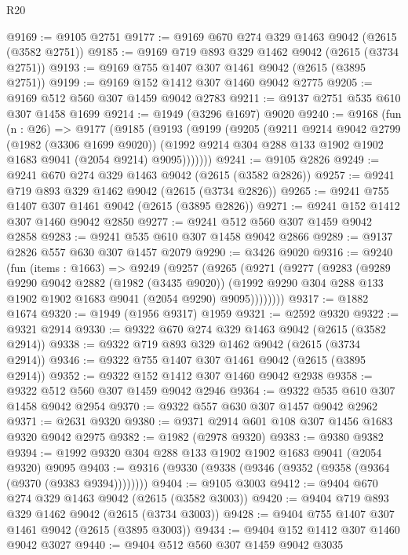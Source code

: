 \begin{lexlean}{R20}
\begin{coremodule}
@9169 := @9105 @2751
@9177 := @9169 @670 @274 @329 @1463 @9042 (@2615 (@3582 @2751))
@9185 := @9169 @719 @893 @329 @1462 @9042 (@2615 (@3734 @2751))
@9193 := @9169 @755 @1407 @307 @1461 @9042 (@2615 (@3895 @2751))
@9199 := @9169 @152 @1412 @307 @1460 @9042 @2775
@9205 := @9169 @512 @560 @307 @1459 @9042 @2783
@9211 := @9137 @2751 @535 @610 @307 @1458 @1699
@9214 := @1949 (@3296 @1697) @9020
@9240 := @9168
    (fun (n : @26) =>
    @9177
      (@9185
        (@9193
          (@9199
            (@9205
              (@9211
                @9214
                @9042
                @2799
                (@1982 (@3306 @1699 @9020))
                (@1992 @9214 @304 @288 @133 @1902 @1902 @1683 @9041 (@2054 @9214) @9095)))))))
@9241 := @9105 @2826
@9249 := @9241 @670 @274 @329 @1463 @9042 (@2615 (@3582 @2826))
@9257 := @9241 @719 @893 @329 @1462 @9042 (@2615 (@3734 @2826))
@9265 := @9241 @755 @1407 @307 @1461 @9042 (@2615 (@3895 @2826))
@9271 := @9241 @152 @1412 @307 @1460 @9042 @2850
@9277 := @9241 @512 @560 @307 @1459 @9042 @2858
@9283 := @9241 @535 @610 @307 @1458 @9042 @2866
@9289 := @9137 @2826 @557 @630 @307 @1457 @2079
@9290 := @3426 @9020
@9316 := @9240
    (fun (items : @1663) =>
    @9249
      (@9257
        (@9265
          (@9271
            (@9277
              (@9283
                (@9289
                  @9290
                  @9042
                  @2882
                  (@1982 (@3435 @9020))
                  (@1992 @9290 @304 @288 @133 @1902 @1902 @1683 @9041 (@2054 @9290) @9095))))))))
@9317 := @1882 @1674
@9320 := @1949 (@1956 @9317) @1959
@9321 := @2592 @9320
@9322 := @9321 @2914
@9330 := @9322 @670 @274 @329 @1463 @9042 (@2615 (@3582 @2914))
@9338 := @9322 @719 @893 @329 @1462 @9042 (@2615 (@3734 @2914))
@9346 := @9322 @755 @1407 @307 @1461 @9042 (@2615 (@3895 @2914))
@9352 := @9322 @152 @1412 @307 @1460 @9042 @2938
@9358 := @9322 @512 @560 @307 @1459 @9042 @2946
@9364 := @9322 @535 @610 @307 @1458 @9042 @2954
@9370 := @9322 @557 @630 @307 @1457 @9042 @2962
@9371 := @2631 @9320
@9380 := @9371 @2914 @601 @108 @307 @1456 @1683 @9320 @9042 @2975
@9382 := @1982 (@2978 @9320)
@9383 := @9380 @9382
@9394 := @1992 @9320 @304 @288 @133 @1902 @1902 @1683 @9041 (@2054 @9320) @9095
@9403 := @9316 (@9330 (@9338 (@9346 (@9352 (@9358 (@9364 (@9370 (@9383 @9394))))))))
@9404 := @9105 @3003
@9412 := @9404 @670 @274 @329 @1463 @9042 (@2615 (@3582 @3003))
@9420 := @9404 @719 @893 @329 @1462 @9042 (@2615 (@3734 @3003))
@9428 := @9404 @755 @1407 @307 @1461 @9042 (@2615 (@3895 @3003))
@9434 := @9404 @152 @1412 @307 @1460 @9042 @3027
@9440 := @9404 @512 @560 @307 @1459 @9042 @3035

\end{coremodule}
\end{lexlean}
